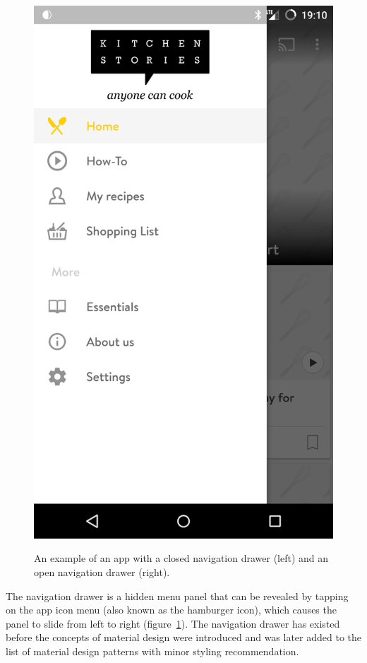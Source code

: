 \begin{figure}[H]
	{{\includegraphics[scale=0.1]{figures/findings/open-nav-drawer-kitchenstories.png} }}%
	\caption{An example of an app with a closed navigation drawer (left) and an open navigation drawer (right).}
	\label{fig:nav_drawer}
\end{figure}
The navigation drawer is a hidden menu panel that can be revealed by tapping on the app icon menu (also known as the hamburger icon), which causes the panel to slide from left to right (figure~\ref{fig:nav_drawer}).
The navigation drawer has existed before the concepts of material design were introduced and was later added to the list of material design patterns with minor styling recommendation.
